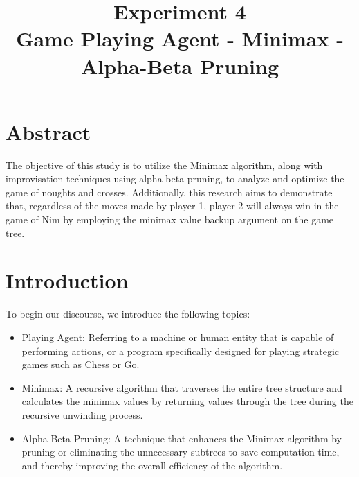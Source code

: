 \documentclass[conference]{IEEEtran}
\begin{document}
\title{Experiment 4\\
{  Game Playing Agent - Minimax - Alpha-Beta Pruning
}
}

\author{
\and
{}
\and
{}
\and
{}
}

\maketitle

\section{Abstract}
The objective of this study is to utilize the Minimax algorithm, along with improvisation techniques using alpha beta pruning, to analyze and optimize the game of noughts and crosses. Additionally, this research aims to demonstrate that, regardless of the moves made by player 1, player 2 will always win in the game of Nim by employing the minimax value backup argument on the game tree.


\section{Introduction}
To begin our discourse, we introduce the following topics:
\begin{itemize}
    \item Playing Agent: Referring to a machine or human entity that is capable of performing actions, or a program specifically designed for playing strategic games such as Chess or Go.
    \item Minimax: A recursive algorithm that traverses the entire tree structure and calculates the minimax values by returning values through the tree during the recursive unwinding process.
    \item Alpha Beta Pruning: A technique that enhances the Minimax algorithm by pruning or eliminating the unnecessary subtrees to save computation time, and thereby improving the overall efficiency of the algorithm.
\end{itemize}
\end{document}
